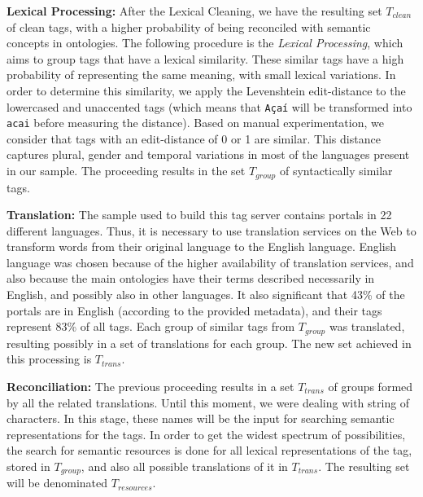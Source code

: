 \noindent \textbf{Lexical Processing:} After the Lexical Cleaning, we have the resulting set $T_{clean}$ of clean tags, with a higher probability of being reconciled with semantic concepts in ontologies.
The following procedure is the \emph{Lexical Processing}, which aims to group tags that have a lexical similarity.
These similar tags have a high probability of representing the same meaning, with small lexical variations.
In order to determine this similarity, we apply the Levenshtein edit-distance to the lowercased and unaccented tags (which means that \texttt{Açaí} will be transformed into \texttt{acai} before measuring the distance).
Based on manual experimentation, we consider that tags with an edit-distance of 0 or 1 are similar.
This distance captures plural, gender and temporal variations in most of the languages present in our sample.
The proceeding results in the set $T_{group}$ of syntactically similar tags.

\noindent \textbf{Translation:} The sample used to build this tag server contains portals in 22 different languages.
Thus, it is necessary to use translation services on the Web to transform words from their original language to the English language.
English language was chosen because of the higher availability of translation services, and also because the main ontologies have their terms described necessarily in English, and possibly also in other languages.
It also significant that 43\% of the portals are in English (according to the provided metadata), and their tags represent 83\% of all tags.
Each group of similar tags from $T_{group}$ was translated, resulting possibly in a set of translations for each group.
The new set achieved in this processing is $T_{trans}$.

\noindent \textbf{Reconciliation:} The previous proceeding results in a set $T_{trans}$ of groups formed by all the related translations.
Until this moment, we were dealing with string of characters.
In this stage, these names will be the input for searching semantic representations for the tags.
In order to get the widest spectrum of possibilities, the search for semantic resources is done for all lexical representations of the tag, stored in $T_{group}$, and also all possible translations of it in $T_{trans}$.
The resulting set will be denominated $T_{resources}$.


